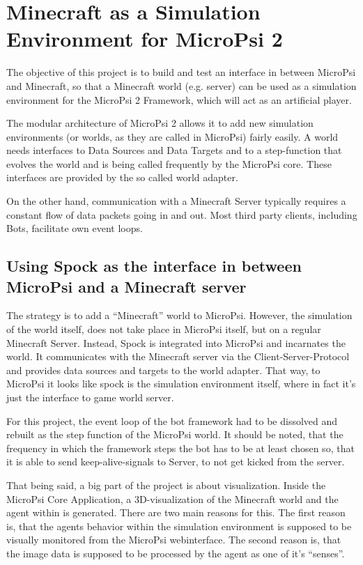 \chapter{Minecraft as a Simulation Environment for MicroPsi 2}
The objective of this project is to build and test an interface in between MicroPsi and Minecraft, so that a Minecraft world (e.g. server) can be used as a simulation environment for the MicroPsi 2 Framework, which will act as an artificial player.

The modular architecture of MicroPsi 2 allows it to add new simulation environments (or worlds, as they are called in MicroPsi) fairly easily. A world needs interfaces to Data Sources and Data Targets and to a step-function that evolves the world and is being called frequently by the MicroPsi core. These interfaces are provided by the so called world adapter. 

On the other hand, communication with a Minecraft Server typically requires a constant flow of data packets going in and out. Most third party clients, including Bots, facilitate own event loops. 

    \section{Using Spock as the interface in between MicroPsi and a Minecraft server}
The strategy is to add a ``Minecraft'' world to MicroPsi. However, the simulation of the world itself, does not take place in MicroPsi itself, but on a regular Minecraft Server. Instead, Spock is integrated into MicroPsi and incarnates the world. It communicates with the Minecraft server via the Client-Server-Protocol and provides data sources and targets to the world adapter. That way, to MicroPsi it looks like spock is the simulation environment itself, where in fact it's just the interface to game world server.

For this project, the event loop of the bot framework had to be dissolved and rebuilt as the step function of the MicroPsi world. It should be noted, that the frequency in which the framework steps the bot has to be at least chosen so, that it is able to send keep-alive-signals to Server, to not get kicked from the server.

That being said, a big part of the project is about visualization. Inside the MicroPsi Core Application, a 3D-visualization of the Minecraft world and the agent within is generated. There are two main reasons for this. The first reason is, that the agents behavior within the simulation environment is supposed to be visually monitored from the MicroPsi webinterface. The second reason is, that the image data is supposed to be processed by the agent as one of it's ``senses''.

